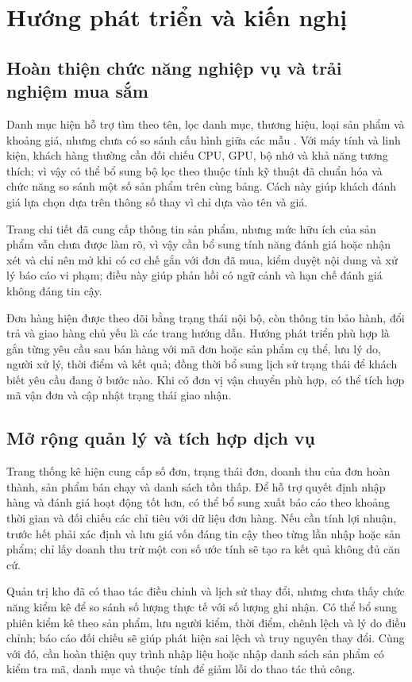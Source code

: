 \section{Hướng phát triển và kiến nghị}

\subsection{Hoàn thiện chức năng nghiệp vụ và trải nghiệm mua sắm}

Danh mục hiện hỗ trợ tìm theo tên, lọc danh mục, thương hiệu, loại sản phẩm và khoảng giá, nhưng chưa có so sánh cấu hình giữa các mẫu . Với máy tính và linh kiện, khách hàng thường cần đối chiếu CPU, GPU, bộ nhớ và khả năng tương thích; vì vậy có thể bổ sung bộ lọc theo thuộc tính kỹ thuật đã chuẩn hóa và chức năng so sánh một số sản phẩm trên cùng bảng. Cách này giúp khách đánh giá lựa chọn dựa trên thông số thay vì chỉ dựa vào tên và giá.

Trang chi tiết đã cung cấp thông tin sản phẩm, nhưng mức hữu ích của sản phẩm vẫn chưa được làm rõ, vì vậy cần bổ sung tính năng đánh giá hoặc nhận xét và chỉ nên mở khi có cơ chế gắn với đơn đã mua, kiểm duyệt nội dung và xử lý báo cáo vi phạm; điều này giúp phản hồi có ngữ cảnh và hạn chế đánh giá không đáng tin cậy.

Đơn hàng hiện được theo dõi bằng trạng thái nội bộ, còn thông tin bảo hành, đổi trả và giao hàng chủ yếu là các trang hướng dẫn. Hướng phát triển phù hợp là gắn từng yêu cầu sau bán hàng với mã đơn hoặc sản phẩm cụ thể, lưu lý do, người xử lý, thời điểm và kết quả; đồng thời bổ sung lịch sử trạng thái để khách biết yêu cầu đang ở bước nào. Khi có đơn vị vận chuyển phù hợp, có thể tích hợp mã vận đơn và cập nhật trạng thái giao nhận.

\subsection{Mở rộng quản lý và tích hợp dịch vụ}

Trang thống kê hiện cung cấp số đơn, trạng thái đơn, doanh thu của đơn hoàn thành, sản phẩm bán chạy và danh sách tồn thấp. Để hỗ trợ quyết định nhập hàng và đánh giá hoạt động tốt hơn, có thể bổ sung xuất báo cáo theo khoảng thời gian và đối chiếu các chỉ tiêu với dữ liệu đơn hàng. Nếu cần tính lợi nhuận, trước hết phải xác định và lưu giá vốn đáng tin cậy theo từng lần nhập hoặc sản phẩm; chỉ lấy doanh thu trừ một con số ước tính sẽ tạo ra kết quả không đủ căn cứ.

Quản trị kho đã có thao tác điều chỉnh và lịch sử thay đổi, nhưng chưa thấy chức năng kiểm kê để so sánh số lượng thực tế với số lượng ghi nhận. Có thể bổ sung phiên kiểm kê theo sản phẩm, lưu người kiểm, thời điểm, chênh lệch và lý do điều chỉnh; báo cáo đối chiếu sẽ giúp phát hiện sai lệch và truy nguyên thay đổi. Cùng với đó, cần hoàn thiện quy trình nhập liệu hoặc nhập danh sách sản phẩm có kiểm tra mã, danh mục và thuộc tính để giảm lỗi do thao tác thủ công.

